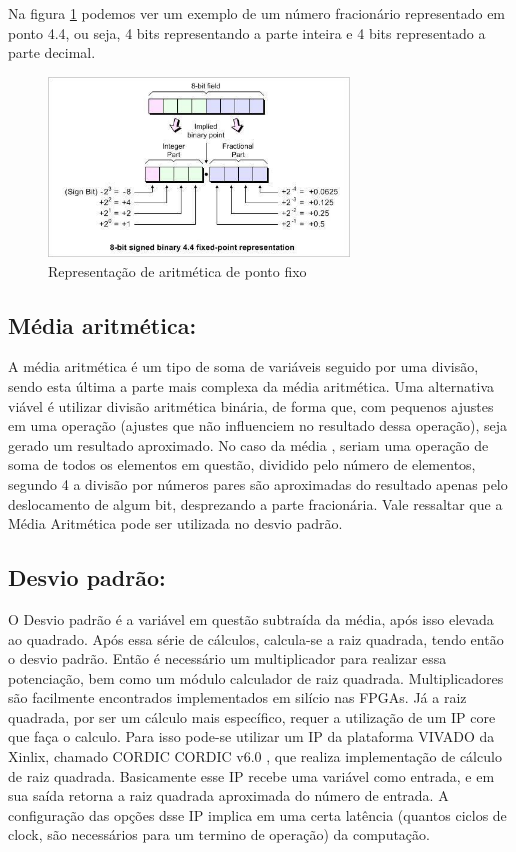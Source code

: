 Na figura \ref{fp} podemos ver um exemplo de um número fracionário representado em ponto 4.4, ou seja, 4 bits representando a parte inteira e 4 bits representado a parte decimal. 

\begin{figure}[H]
	\centering
	\includegraphics[width=8cm]{figures/fp.jpg}
	\caption{Representação de aritmética de ponto fixo}
	\label{fp}
\end{figure}




\subsection{Média aritmética:}  A média aritmética é um tipo de soma de variáveis seguido por uma divisão, sendo esta  última a parte mais complexa da média aritmética. Uma alternativa viável é utilizar divisão aritmética binária, de forma que, com pequenos ajustes em uma operação (ajustes que não influenciem no resultado dessa operação), seja gerado um resultado aproximado. No caso da média , seriam uma operação de soma de todos os elementos em questão, dividido pelo número de elementos, segundo {4} a divisão por números pares são aproximadas do resultado apenas pelo deslocamento de algum bit, desprezando a parte fracionária. Vale ressaltar que a Média Aritmética pode ser utilizada no desvio padrão.

\subsection {Desvio padrão:} O Desvio padrão é a variável em questão subtraída da média, após isso elevada ao quadrado. Após essa série de cálculos, calcula-se a raiz quadrada, tendo então o desvio padrão. Então é necessário um multiplicador para realizar essa potenciação, bem como um módulo calculador de raiz quadrada. Multiplicadores são facilmente encontrados implementados em silício nas FPGAs. Já a raiz quadrada, por ser um cálculo mais específico, requer a utilização de um IP core que faça o calculo. Para isso pode-se utilizar um  IP da plataforma VIVADO da Xinlix, chamado CORDIC {CORDIC v6.0} , que realiza  implementação de cálculo de raiz quadrada. Basicamente esse IP recebe uma variável como entrada, e em sua saída retorna a raiz quadrada aproximada do número de entrada. A configuração das opções dsse IP implica em uma certa latência (quantos ciclos de clock, são necessários para um termino de operação) da computação.



